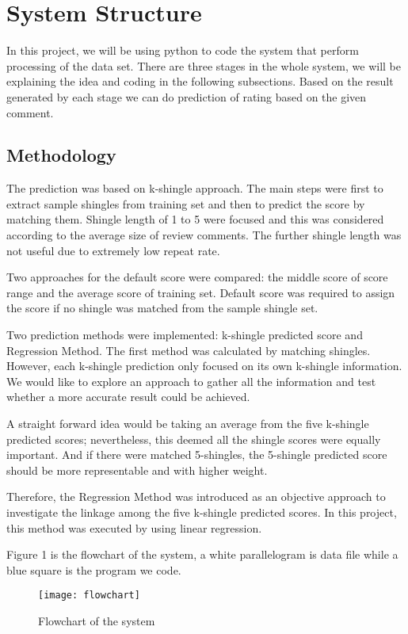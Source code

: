\section{System Structure}
In this project, we will be using python to code the system that perform processing of the data set. There are three stages in the whole system, we will be explaining the idea and coding in the following subsections. Based on the result generated by each stage we can do prediction of rating based on the given comment.

\subsection{Methodology}
The prediction was based on k-shingle approach. The main steps were first to extract sample shingles from training set and then to predict the score by matching them. Shingle length of 1 to 5 were focused and this was considered according to the average size of review comments. The further shingle length was not useful due to extremely low repeat rate.

Two approaches for the default score were compared: the middle score of score range and the average score of training set. Default score was required to assign the score if no shingle was matched from the sample shingle set.

Two prediction methods were implemented: k-shingle predicted score and Regression Method. The first method was calculated by matching shingles. However, each k-shingle prediction only focused on its own k-shingle information. We would like to explore an approach to gather all the information and test whether a more accurate result could be achieved.

A straight forward idea would be taking an average from the five k-shingle predicted scores; nevertheless, this deemed all the shingle scores were equally important. And if there were matched 5-shingles, the 5-shingle predicted score should be more representable and with higher weight.

Therefore, the Regression Method was introduced as an objective approach to investigate the linkage among the five k-shingle predicted scores. In this project, this method was executed by using linear regression.

Figure 1 is the flowchart of the system, a white parallelogram is data file while a blue square is the program we code.

\begin{figure}
\texttt{[image: flowchart]}
\caption{Flowchart of the system}
\end{figure}

